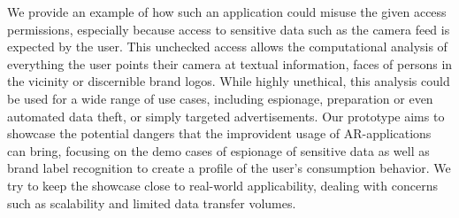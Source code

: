 We provide an example of how such an application could misuse the given access permissions, especially because access to sensitive data such as the camera feed is expected by the user.
This unchecked access allows the computational analysis of everything the user points their camera at textual information, faces of persons in the vicinity or discernible brand logos.
While highly unethical, this analysis could be used for a wide range of use cases, including espionage, preparation or even automated data theft, or simply targeted advertisements.
Our prototype aims to showcase the potential dangers that the improvident usage of AR-applications can bring, focusing on the demo cases of espionage of sensitive data as well as brand label recognition to create a profile of the user's consumption behavior.
We try to keep the showcase close to real-world applicability, dealing with concerns such as scalability and limited data transfer volumes.

